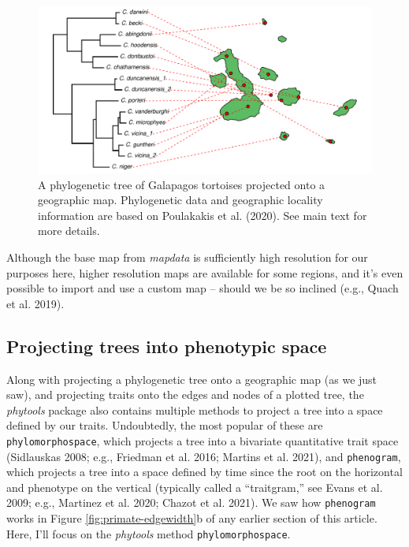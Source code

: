 \documentclass[fleqn,10pt,lineno]{wlpeerj} %
\begin{document}
\begin{figure}
\includegraphics[width=1\linewidth]{Revell.phytools-v2_peerj_files/figure-latex/tortoise-geog-1} \caption{A phylogenetic tree of Galapagos tortoises projected onto a geographic map. Phylogenetic data and geographic locality information are based on Poulakakis et al. (2020). See main text for more details.}\label{fig:tortoise-geog}
\end{figure}

Although the base map from \emph{mapdata} is sufficiently high resolution for our purposes here, higher resolution maps are available for some regions, and it's even possible to import and use a custom map -- should we be so inclined (e.g., Quach et al. 2019).

\hypertarget{projecting-trees-into-phenotypic-space}{%
\subsection{Projecting trees into phenotypic space}\label{projecting-trees-into-phenotypic-space}}

Along with projecting a phylogenetic tree onto a geographic map (as we just saw), and projecting traits onto the edges and nodes of a plotted tree, the \emph{phytools} package also contains multiple methods to project a tree into a space defined by our traits. Undoubtedly, the most popular of these are \texttt{phylomorphospace}, which projects a tree into a bivariate quantitative trait space (Sidlauskas 2008; e.g., Friedman et al. 2016; Martins et al. 2021), and \texttt{phenogram}, which projects a tree into a space defined by time since the root on the horizontal and phenotype on the vertical (typically called a ``traitgram,'' see Evans et al. 2009; e.g., Martinez et al. 2020; Chazot et al. 2021). We saw how \texttt{phenogram} works in Figure \ref{fig:primate-edgewidth}b of any earlier section of this article. Here, I'll focus on the \emph{phytools} method \texttt{phylomorphospace}.
\end{document}
